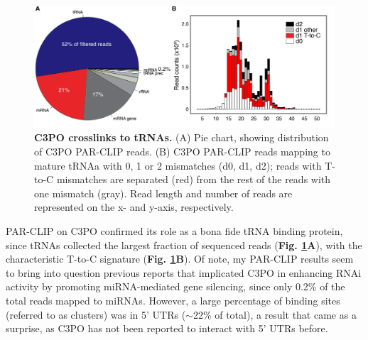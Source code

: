 \documentclass[12pt]{rockefeller}
\begin{document}
\begin{figure}[!ht]%
\centering
\includegraphics[width=\textwidth]{c3po_pavel.png}%
\caption[C3PO crosslinks to tRNAs.]
{
\textbf{C3PO crosslinks to tRNAs.}
(A) Pie chart, showing distribution of C3PO PAR-CLIP reads. (B) C3PO PAR-CLIP reads mapping to mature tRNAa with 0, 1 or 2 mismatches (d0, d1, d2); reads with T-to-C mismatches are separated (red) from the rest of the reads with one mismatch (gray). Read length and number of reads are represented on the x- and y-axis, respectively. 
}
\centering
\label{c3po_pavel}%
\end{figure} 

PAR-CLIP on C3PO confirmed its role as a bona fide tRNA binding protein, since tRNAs collected the largest fraction of sequenced reads (\textbf{Fig. \ref{c3po_pavel}A}), with the characteristic T-to-C signature (\textbf{Fig. \ref{c3po_pavel}B}). Of note, my PAR-CLIP results seem to bring into question previous reports that implicated C3PO in enhancing RNAi activity by promoting miRNA-mediated gene silencing, since only 0.2\% of the total reads mapped to miRNAs. However, a large percentage of binding sites (referred to as clusters) was in 5’ UTRs ($\sim$22\% of total), a result that came as a surprise, as C3PO has not been reported to interact with 5’ UTRs before. 
\end{document}

